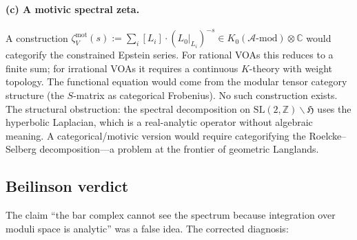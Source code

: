 \documentclass[11pt]{article}
\newcommand{\cA}{\mathcal{A}}
\newcommand{\C}{\mathbb{C}}
\newcommand{\Z}{\mathbb{Z}}
\begin{document}
\paragraph{(c) A motivic spectral zeta.}
A construction
$\zeta^{\mathrm{mot}}_V(s) := \sum_i [L_i] \cdot
(L_0|_{L_i})^{-s} \in K_0(\cA\text{-}\mathrm{mod})
\otimes \C$
would categorify the constrained Epstein series.  For rational
VOAs this reduces to a finite sum; for irrational VOAs it requires
a continuous $K$-theory with weight topology.  The functional
equation would come from the modular tensor category structure
(the $S$-matrix as categorical Frobenius).  No such construction
exists.  The structural obstruction: the spectral decomposition on
$\mathrm{SL}(2,\Z)\backslash\mathfrak{H}$ uses the hyperbolic
Laplacian, which is a real-analytic operator without algebraic
meaning.  A categorical/motivic version would require categorifying
the Roelcke--Selberg decomposition---a problem at the frontier
of geometric Langlands.

\subsection{Beilinson verdict}

The claim ``the bar complex cannot see the spectrum because
integration over moduli space is analytic'' was a false idea.
The corrected diagnosis:
\end{document}
